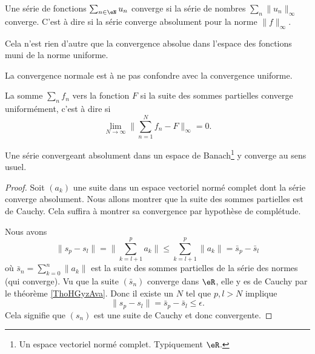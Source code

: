 \begin{definition} \label{DefVBrJUxo}
    Une série de fonctions \( \sum_{n\in \eN}u_n \) converge  si la série de nombres \( \sum_n\| u_n \|_{\infty}\) converge. C'est à dire si la série converge absolument pour la norme \( \| f \|_{\infty}\).
\end{definition}
Cela n'est rien d'autre que la convergence absolue dans l'espace des fonctions muni de la norme uniforme.

La convergence normale est à ne pas confondre avec la convergence uniforme. 

\begin{definition}
    La somme \( \sum_nf_n\)  vers la fonction \( F\) si la suite des sommes partielles converge uniformément, c'est à dire si 
    \begin{equation}        \label{EqLNCJooVCTiIw}
        \lim_{N\to \infty} \| \sum_{n=1}^Nf_n-F \|_{\infty}=0.
    \end{equation}
\end{definition}

\begin{proposition} \label{PropAKCusNM}
    Une série convergeant absolument dans un espace de Banach\footnote{Un espace vectoriel normé complet. Typiquement \( \eR\).} y converge au sens usuel.
\end{proposition}

\begin{proof}
    Soit \( (a_k)\) une suite dans un espace vectoriel normé complet dont la série converge absolument. Nous allons montrer que la suite des sommes partielles est de Cauchy. Cela suffira à montrer sa convergence par hypothèse de complétude.

    Nous avons
    \begin{equation}
        \| s_p-s_l \|=\| \sum_{k=l+1}^{p}a_k\|  \leq\sum_{k=l+1}^p\| a_k \|=\bar s_p-\bar s_l
    \end{equation}
    où \( \bar s_n=\sum_{k=0}^n \| a_k \|\) est la suite des sommes partielles de la série des normes (qui converge). Vu que la suite \( (\bar s_n)\) converge dans \( \eR\), elle y es de Cauchy par le théorème \ref{ThoHGyzAva}. Donc il existe un \( N\) tel que \( p,l>N\) implique
    \begin{equation}
        \| s_p-s_l \|=\bar s_p-\bar s_l\leq \epsilon.
    \end{equation}
    Cela signifie que \( (s_n)\) est une suite de Cauchy et donc convergente.
\end{proof}

